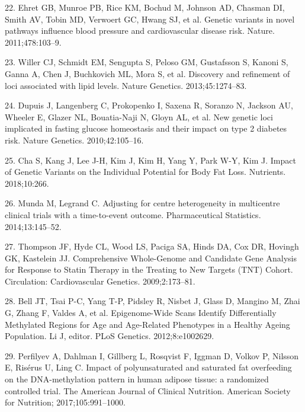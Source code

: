 \documentclass[]{article}
\begin{document}
\leavevmode\hypertarget{ref-Ehret2011}{}%
22. Ehret GB, Munroe PB, Rice KM, Bochud M, Johnson AD, Chasman DI,
Smith AV, Tobin MD, Verwoert GC, Hwang SJ, et al. Genetic variants in
novel pathways influence blood pressure and cardiovascular disease risk.
Nature. 2011;478:103--9.

\leavevmode\hypertarget{ref-Willer2013}{}%
23. Willer CJ, Schmidt EM, Sengupta S, Peloso GM, Gustafsson S, Kanoni
S, Ganna A, Chen J, Buchkovich ML, Mora S, et al. Discovery and
refinement of loci associated with lipid levels. Nature Genetics.
2013;45:1274--83.

\leavevmode\hypertarget{ref-Dupuis2010}{}%
24. Dupuis J, Langenberg C, Prokopenko I, Saxena R, Soranzo N, Jackson
AU, Wheeler E, Glazer NL, Bouatia-Naji N, Gloyn AL, et al. New genetic
loci implicated in fasting glucose homeostasis and their impact on type
2 diabetes risk. Nature Genetics. 2010;42:105--16.

\leavevmode\hypertarget{ref-Cha2018}{}%
25. Cha S, Kang J, Lee J-H, Kim J, Kim H, Yang Y, Park W-Y, Kim J.
Impact of Genetic Variants on the Individual Potential for Body Fat
Loss. Nutrients. 2018;10:266.

\leavevmode\hypertarget{ref-Munda2014}{}%
26. Munda M, Legrand C. Adjusting for centre heterogeneity in
multicentre clinical trials with a time-to-event outcome. Pharmaceutical
Statistics. 2014;13:145--52.

\leavevmode\hypertarget{ref-Thompson2009}{}%
27. Thompson JF, Hyde CL, Wood LS, Paciga SA, Hinds DA, Cox DR, Hovingh
GK, Kastelein JJ. Comprehensive Whole-Genome and Candidate Gene Analysis
for Response to Statin Therapy in the Treating to New Targets (TNT)
Cohort. Circulation: Cardiovascular Genetics. 2009;2:173--81.

\leavevmode\hypertarget{ref-Bell2012}{}%
28. Bell JT, Tsai P-C, Yang T-P, Pidsley R, Nisbet J, Glass D, Mangino
M, Zhai G, Zhang F, Valdes A, et al. Epigenome-Wide Scans Identify
Differentially Methylated Regions for Age and Age-Related Phenotypes in
a Healthy Ageing Population. Li J, editor. PLoS Genetics.
2012;8:e1002629.

\leavevmode\hypertarget{ref-Perfilyev2017}{}%
29. Perfilyev A, Dahlman I, Gillberg L, Rosqvist F, Iggman D, Volkov P,
Nilsson E, Risérus U, Ling C. Impact of polyunsaturated and saturated
fat overfeeding on the DNA-methylation pattern in human adipose tissue:
a randomized controlled trial. The American Journal of Clinical
Nutrition. American Society for Nutrition; 2017;105:991--1000.
\end{document}

